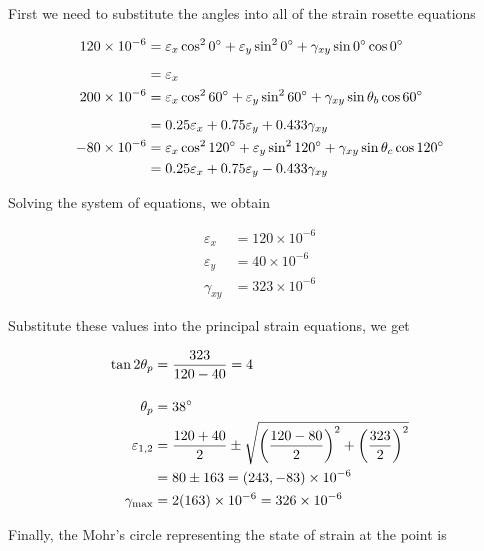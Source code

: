 \documentclass[
10pt,
a4paper,
openany,
svgnames,
]{book} %
\begin{document}
\begin{solution}

  First we need to substitute the angles into all of the strain rosette equations

  \begin{align*}
    120 \times 10^{-6} &= \varepsilon_x \cos^2 0\degree + \varepsilon_y \sin^2 0\degree + \gamma_{xy} \sin 0\degree \cos 0\degree \\[5pt]
                       &= \varepsilon_x \\
    200 \times 10^{-6} &= \varepsilon_x \cos^2 60\degree + \varepsilon_y \sin^2 60\degree + \gamma_{xy} \sin \theta_b \cos 60\degree \\[5pt]
                       &= 0.25\varepsilon_x + 0.75\varepsilon_y + 0.433\gamma_{xy} \\
    -80 \times 10^{-6} &= \varepsilon_x \cos^2 120\degree + \varepsilon_y \sin^2 120\degree + \gamma_{xy} \sin \theta_c \cos 120\degree \\
                       &= 0.25\varepsilon_x + 0.75\varepsilon_y -0.433\gamma_{xy}
  \end{align*}

  Solving the system of equations, we obtain

  \begin{align*}
    \varepsilon_x &= 120 \times 10^{-6} \\
    \varepsilon_y &= 40 \times 10^{-6} \\
    \gamma_{xy} &= 323 \times 10^{-6}
  \end{align*}

  Substitute these values into the principal strain equations, we get

  \begin{align*}
    \tan 2\theta_p &= \frac{323}{120 - 40} = 4\\[10pt]
    \theta_p &=  38\degree \\
    \varepsilon_{1,2} &= \frac{120 + 40}{2} \pm \sqrt{ \left( \frac{120 - 80}{2} \right)^2 + \left( \frac{323}{2} \right)^2 } \\
                   &= 80 \pm 163 = (243, -83) \times 10^{-6} \\
    \gamma_{\max} &= 2(163) \times 10^{-6} = 326 \times 10^{-6}
  \end{align*}

  Finally, the Mohr's circle representing the state of strain at the point is


\end{solution}
\end{document}
